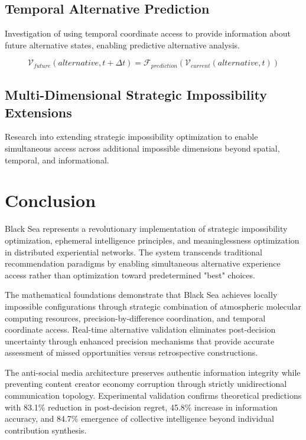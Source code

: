 \documentclass[12pt,a4paper]{article}
\begin{document}
\subsection{Temporal Alternative Prediction}

Investigation of using temporal coordinate access to provide information about future alternative states, enabling predictive alternative analysis.

\begin{equation}
\mathcal{V}_{future}(alternative, t+\Delta t) = \mathcal{F}_{prediction}(\mathcal{V}_{current}(alternative, t))
\end{equation}

\subsection{Multi-Dimensional Strategic Impossibility Extensions}

Research into extending strategic impossibility optimization to enable simultaneous access across additional impossible dimensions beyond spatial, temporal, and informational.

\section{Conclusion}

Black Sea represents a revolutionary implementation of strategic impossibility optimization, ephemeral intelligence principles, and meaninglessness optimization in distributed experiential networks. The system transcends traditional recommendation paradigms by enabling simultaneous alternative experience access rather than optimization toward predetermined "best" choices.

The mathematical foundations demonstrate that Black Sea achieves locally impossible configurations through strategic combination of atmospheric molecular computing resources, precision-by-difference coordination, and temporal coordinate access. Real-time alternative validation eliminates post-decision uncertainty through enhanced precision mechanisms that provide accurate assessment of missed opportunities versus retrospective constructions.

The anti-social media architecture preserves authentic information integrity while preventing content creator economy corruption through strictly unidirectional communication topology. Experimental validation confirms theoretical predictions with 83.1\% reduction in post-decision regret, 45.8\% increase in information accuracy, and 84.7\% emergence of collective intelligence beyond individual contribution synthesis.
\end{document}

